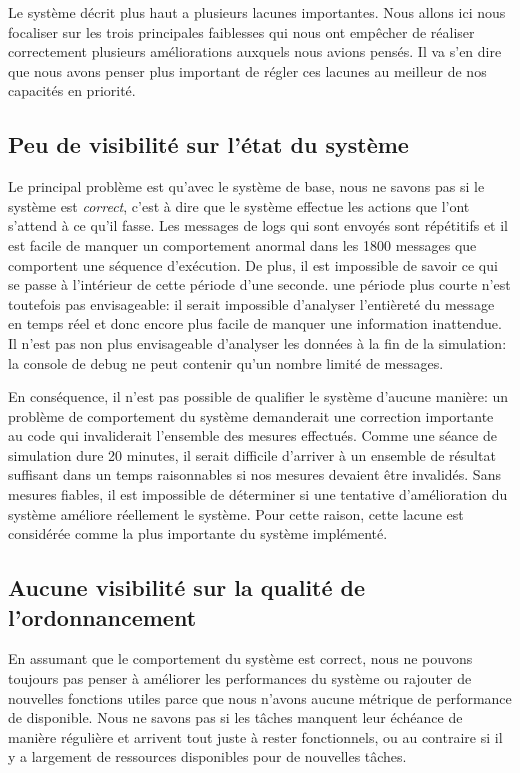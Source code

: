 \documentclass[journal]{IEEEtran}
\begin{document}
Le système décrit plus haut a plusieurs lacunes importantes. Nous allons ici nous focaliser sur les trois principales faiblesses qui nous ont empêcher de réaliser correctement plusieurs améliorations auxquels nous avions pensés. Il va s'en dire que nous avons penser plus important de régler ces lacunes au meilleur de nos capacités en priorité.

\subsection{Peu de visibilité sur l'état du système}

Le principal problème est qu'avec le système de base, nous ne savons pas si le système est \emph{correct}, c'est à dire que le système effectue les actions que l'ont s'attend à ce qu'il fasse. Les messages de logs qui sont envoyés sont répétitifs et il est facile de manquer un comportement anormal dans les 1800 messages que comportent une séquence d'exécution. De plus, il est impossible de savoir ce qui se passe à l'intérieur de cette période d'une seconde. une période plus courte n'est toutefois pas envisageable: il serait impossible d'analyser l'entièreté du message en temps réel et donc encore plus facile de manquer une information inattendue. Il n'est pas non plus envisageable d'analyser les données à la fin de la simulation: la console de debug ne peut contenir qu'un nombre limité de messages.

En conséquence, il n'est pas possible de qualifier le système d'aucune manière: un problème de comportement du système demanderait une correction importante au code qui invaliderait l'ensemble des mesures effectués. Comme une séance de simulation dure 20 minutes, il serait difficile d'arriver à un ensemble de résultat suffisant dans un temps raisonnables si nos mesures devaient être invalidés. Sans mesures fiables, il est impossible de déterminer si une tentative d'amélioration du système améliore réellement le système. Pour cette raison, cette lacune est considérée comme la plus importante du système implémenté.

\subsection{Aucune visibilité sur la qualité de l'ordonnancement}

En assumant que le comportement du système est correct, nous ne pouvons toujours pas penser à améliorer les performances du système ou rajouter de nouvelles fonctions utiles parce que nous n'avons aucune métrique de performance de disponible. Nous ne savons pas si les tâches manquent leur échéance de manière régulière et arrivent tout juste à rester fonctionnels, ou au contraire si il y a largement de ressources disponibles pour de nouvelles tâches.
\end{document}
